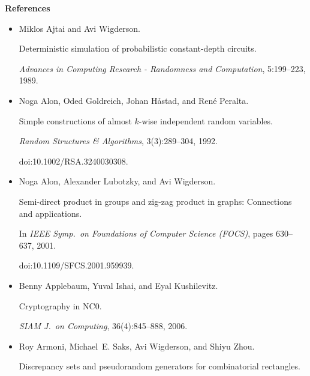 \documentclass[10pt,a4paper]{article}
\begin{document}
\par\medskip\noindent\textbf{References}\par



\begin{itemize}


\item[] 
[1]

Miklos Ajtai and Avi Wigderson.


Deterministic simulation of probabilistic constant-depth circuits.


\emph{Advances in Computing Research - Randomness and Computation},
5:199–223, 1989.





\item[] 
[2]

Noga Alon, Oded Goldreich, Johan Håstad, and René Peralta.


Simple constructions of almost $k$-wise independent random
variables.


\emph{Random Structures \& Algorithms}, 3(3):289–304, 1992.


doi:10.1002/RSA.3240030308.





\item[] 
[3]

Noga Alon, Alexander Lubotzky, and Avi Wigderson.


Semi-direct product in groups and zig-zag product in graphs:
Connections and applications.


In \emph{IEEE Symp. on Foundations of Computer Science (FOCS)}, pages
630–637, 2001.


doi:10.1109/SFCS.2001.959939.





\item[] 
[4]

Benny Applebaum, Yuval Ishai, and Eyal Kushilevitz.


Cryptography in NC0.


\emph{SIAM J. on Computing}, 36(4):845–888, 2006.





\item[] 
[5]

Roy Armoni, Michael E. Saks, Avi Wigderson, and Shiyu Zhou.


Discrepancy sets and pseudorandom generators for combinatorial
rectangles.



\end{itemize}
\end{document}
